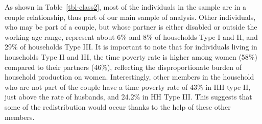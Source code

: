 \documentclass[
  11pt,
]{article}
\begin{document}
\begin{table}[H]

\caption{\label{tbl-class2}Individual Classification for Redistribution
Analysis: Time Poverty Rate}


\end{table}%

As shown in Table~\ref{tbl-class2}, most of the individuals in the
sample are in a couple relationship, thus part of our main sample of
analysis. Other individuals, who may be part of a couple, but whose
partner is either disabled or outside the working-age range, represent
about 6\% and 8\% of households Type I and II, and 29\% of households
Type III. It is important to note that for individuals living in
households Type II and III, the time poverty rate is higher among women
(58\%) compared to their partners (46\%), reflecting the
disproportionate burden of household production on women. Interestingly,
other members in the household who are not part of the couple have a
time poverty rate of 43\% in HH type II, just above the rate of
husbands, and 24.2\% in HH Type III. This suggests that some of the
redistribution would occur thanks to the help of these other members.
\end{document}
